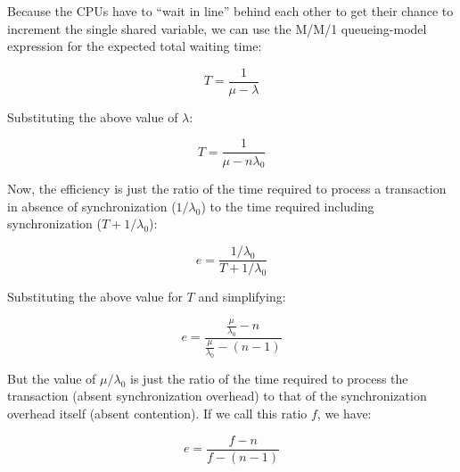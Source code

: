 Because the CPUs have to ``wait in line'' behind each other to get their
chance to increment the single shared variable, we can use the M/M/1
queueing-model expression for the expected total waiting time:

\begin{equation}
	T = \frac{1}{\mu - \lambda}
\end{equation}

Substituting the above value of $\lambda$:

\begin{equation}
	T = \frac{1}{\mu - n \lambda_0}
\end{equation}

Now, the efficiency is just the ratio of the time required to process
a transaction in absence of synchronization ($1 / \lambda_0$)
to the time required including synchronization ($T + 1 / \lambda_0$):

\begin{equation}
	e = \frac{1 / \lambda_0}{T + 1 / \lambda_0}
\end{equation}

Substituting the above value for $T$ and simplifying:

\begin{equation}
	e = \frac{\frac{\mu}{\lambda_0} - n}{\frac{\mu}{\lambda_0} - (n - 1)}
\end{equation}

But the value of $\mu / \lambda_0$ is just the ratio of the time required
to process the transaction (absent synchronization overhead) to that of 
the synchronization overhead itself (absent contention).
If we call this ratio $f$, we have:

\begin{equation}
	e = \frac{f - n}{f - (n - 1)}
\end{equation}

